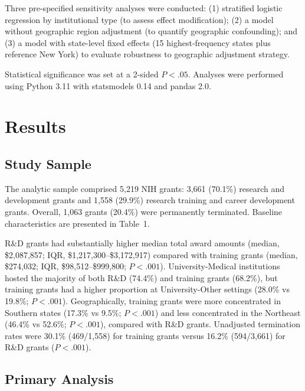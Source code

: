 \documentclass[10pt, letterpaper]{article}
\begin{document}
Three pre-specified sensitivity analyses were conducted: (1) stratified logistic regression by institutional type (to assess effect modification); (2) a model without geographic region adjustment (to quantify geographic confounding); and (3) a model with state-level fixed effects (15 highest-frequency states plus reference New York) to evaluate robustness to geographic adjustment strategy.

Statistical significance was set at a 2-sided $P < .05$. Analyses were performed using Python 3.11 with statsmodels 0.14 and pandas 2.0.\cite{VonElm2007,Dewidar2025}

\section*{Results}

\subsection*{Study Sample}

The analytic sample comprised 5,219 NIH grants: 3,661 (70.1\%) research and development grants and 1,558 (29.9\%) research training and career development grants. Overall, 1,063 grants (20.4\%) were permanently terminated. Baseline characteristics are presented in Table~1.

R\&D grants had substantially higher median total award amounts (median, \$2,087,857; IQR, \$1,217,300--\$3,172,917) compared with training grants (median, \$274,032; IQR, \$98,512--\$999,800; $P < .001$). University-Medical institutions hosted the majority of both R\&D (74.4\%) and training grants (68.2\%), but training grants had a higher proportion at University-Other settings (28.0\% vs 19.8\%; $P < .001$). Geographically, training grants were more concentrated in Southern states (17.3\% vs 9.5\%; $P < .001$) and less concentrated in the Northeast (46.4\% vs 52.6\%; $P < .001$), compared with R\&D grants. Unadjusted termination rates were 30.1\% (469/1,558) for training grants versus 16.2\% (594/3,661) for R\&D grants ($P < .001$).

\vspace{6pt}



\subsection*{Primary Analysis}
\end{document}

